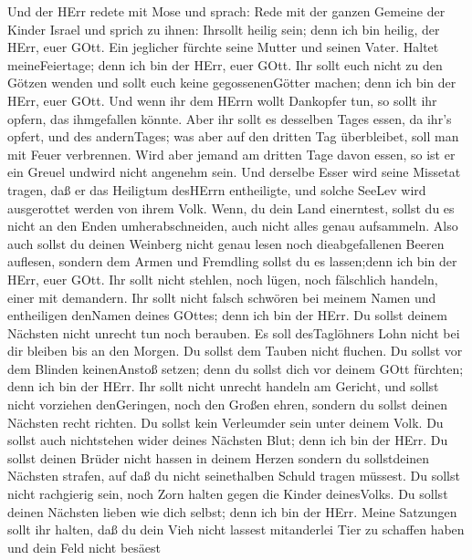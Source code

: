  Und der HErr redete mit Mose und sprach:  Rede
mit der ganzen Gemeine der Kinder Israel und sprich zu ihnen: Ihrsollt
heilig sein; denn ich bin heilig, der HErr, euer GOtt.  Ein
jeglicher fürchte seine Mutter und seinen Vater. Haltet meineFeiertage;
denn ich bin der HErr, euer GOtt.  Ihr sollt euch nicht zu
den Götzen wenden und sollt euch keine gegossenenGötter machen; denn ich
bin der HErr, euer GOtt.  Und wenn ihr dem HErrn wollt
Dankopfer tun, so sollt ihr opfern, das ihmgefallen könnte. 
Aber ihr sollt es desselben Tages essen, da ihr's opfert, und des
andernTages; was aber auf den dritten Tag überbleibet, soll man mit
Feuer verbrennen.  Wird aber jemand am dritten Tage davon
essen, so ist er ein Greuel undwird nicht angenehm sein. 
Und derselbe Esser wird seine Missetat tragen, daß er das Heiligtum
desHErrn entheiligte, und solche SeeLev wird ausgerottet werden von
ihrem Volk.  Wenn, du dein Land einerntest, sollst du es
nicht an den Enden umherabschneiden, auch nicht alles genau aufsammeln.
 Also auch sollst du deinen Weinberg nicht genau lesen noch
dieabgefallenen Beeren auflesen, sondern dem Armen und Fremdling sollst
du es lassen;denn ich bin der HErr, euer GOtt.  Ihr sollt
nicht stehlen, noch lügen, noch fälschlich handeln, einer mit demandern.
 Ihr sollt nicht falsch schwören bei meinem Namen und
entheiligen denNamen deines GOttes; denn ich bin der HErr. 
Du sollst deinem Nächsten nicht unrecht tun noch berauben. Es soll
desTaglöhners Lohn nicht bei dir bleiben bis an den Morgen.
 Du sollst dem Tauben nicht fluchen. Du sollst vor dem
Blinden keinenAnstoß setzen; denn du sollst dich vor deinem GOtt
fürchten; denn ich bin der HErr.  Ihr sollt nicht unrecht
handeln am Gericht, und sollst nicht vorziehen denGeringen, noch den
Großen ehren, sondern du sollst deinen Nächsten recht richten.
 Du sollst kein Verleumder sein unter deinem Volk. Du
sollst auch nichtstehen wider deines Nächsten Blut; denn ich bin der
HErr.  Du sollst deinen Brüder nicht hassen in deinem
Herzen sondern du sollstdeinen Nächsten strafen, auf daß du nicht
seinethalben Schuld tragen müssest.  Du sollst nicht
rachgierig sein, noch Zorn halten gegen die Kinder deinesVolks. Du
sollst deinen Nächsten lieben wie dich selbst; denn ich bin der HErr.
 Meine Satzungen sollt ihr halten, daß du dein Vieh nicht
lassest mitanderlei Tier zu schaffen haben und dein Feld nicht besäest
